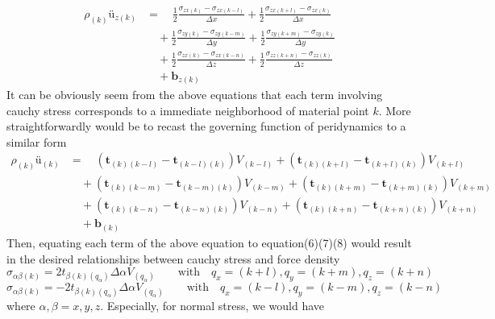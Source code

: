 \documentclass[a4paper,11pt,CJK]{paper}
\newcommand{\bft}{\textbf{t}}
\begin{document}
\begin{equation}
\begin{aligned}
\rho_{(k)}\textbf{\"u}_{z(k)} &= \quad \frac{1}{2}\frac{\sigma_{zx(k)} - \sigma_{zx(k-l)}}{\Delta x} + \frac{1}{2}\frac{\sigma_{zx(k+l)} - \sigma_{zx(k)}}{\Delta x}\\
                              &\quad+  \frac{1}{2}\frac{\sigma_{zy(k)} - \sigma_{zy(k-m)}}{\Delta y} + \frac{1}{2}\frac{\sigma_{zy(k+m)} - \sigma_{zy(k)}}{\Delta y}\\
                              &\quad+  \frac{1}{2}\frac{\sigma_{zx(k)} - \sigma_{zx(k-n)}}{\Delta z} + \frac{1}{2}\frac{\sigma_{zz(k+n)} - \sigma_{zz(k)}}{\Delta z}\\
                              &\quad + \textbf{b}_{z(k)}
\end{aligned}
\end{equation}
It can be obviously seem from the above equations that each term involving cauchy stress corresponds to a immediate neighborhood of material point $k$.
More straightforwardly would be to recast the governing function of peridynamics to a similar form
\begin{equation}
\begin{aligned}
\rho_{(k)}\textbf{\"u}_{(k)} &= \quad (\bft_{(k)(k-l)} - \bft_{(k-l)(k)})V_{(k-l)} + (\bft_{(k)(k+l)} - \bft_{(k+l)(k)})V_{(k+l)}\\
                             &\quad + (\bft_{(k)(k-m)} - \bft_{(k-m)(k)})V_{(k-m)} + (\bft_{(k)(k+m)} - \bft_{(k+m)(k)})V_{(k+m)}\\
                             &\quad + (\bft_{(k)(k-n)} - \bft_{(k-n)(k)})V_{(k-n)} + (\bft_{(k)(k+n)} - \bft_{(k+n)(k)})V_{(k+n)}\\
                             &\quad  + \textbf{b}_{(k)}
\end{aligned}
\end{equation}
Then, equating each term of the above equation to equation(6)(7)(8) would result in the desired relationships between cauchy stress and force density
\begin{equation}
\sigma_{\alpha\beta(k)} = 2t_{\beta(k)(q_\alpha)}\Delta\alpha V_{(q_\alpha)}\qquad \mathrm{with } \quad q_x=(k+l),q_y=(k+m),q_z=(k+n)
\end{equation}
\begin{equation}
\sigma_{\alpha\beta(k)} = -2t_{\beta(k)(q_\alpha)}\Delta\alpha V_{(q_\alpha)}\qquad \mathrm{with } \quad q_x=(k-l),q_y=(k-m),q_z=(k-n)
\end{equation}
where $\alpha,\beta=x,y,z$. Especially, for normal stress, we would have
\end{document}
